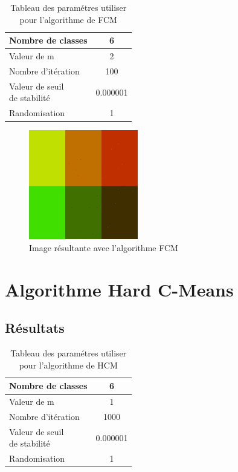 \documentclass[a4paper,11pt]{article}
\begin{document}
\begin{table}[H]
  \begin{center}
    \begin{tabular}{|l|c|}
      \hline
      Nombre de classes & 6 \\
      \hline
      Valeur de m & 2 \\
      \hline
      Nombre d'itération & 100 \\
      \hline
      \shortstack{ Valeur de seuil \\ de stabilité } & 0.000001 \\
      \hline
      Randomisation & 1 \\
      \hline
    \end{tabular}
    \caption{Tableau des paramétres utiliser pour l'algorithme de FCM}
  \end{center}
\end{table}


\begin{figure}[H]
  \begin{center} 
    \includegraphics[width=180px]{../img/segFCM.png}
    \caption{Image résultante avec l'algorithme FCM}
  \end{center}
\end{figure}

\section{Algorithme Hard C-Means}

\subsection{Résultats}

\begin{table}[H]
  \begin{center}
    \begin{tabular}{|l|c|}
      \hline
      Nombre de classes & 6 \\
      \hline
      Valeur de m & 1 \\
      \hline
      Nombre d'itération & 1000 \\
      \hline
      \shortstack{ Valeur de seuil \\ de stabilité }  & 0.000001 \\
      \hline
      Randomisation & 1 \\
      \hline
    \end{tabular}
    \caption{Tableau des paramétres utiliser pour l'algorithme de HCM}
  \end{center}
\end{table}
\end{document}
